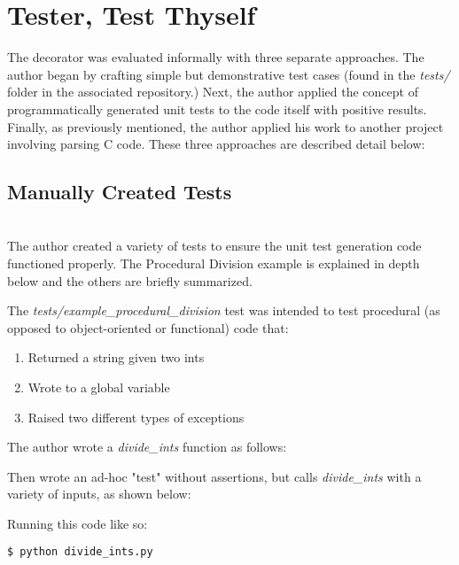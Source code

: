 \section{Tester, Test Thyself}\label{sec:evaluation}

The decorator was evaluated informally with three separate approaches.
The author began by crafting simple but demonstrative test cases 
(found in the \textit{tests/} folder in the associated repository.) Next,
the author applied the concept of programmatically generated unit tests
to the code itself with positive results.  Finally, as previously mentioned, 
the author applied his work to another project involving parsing C code. 
These three approaches are described detail below:

\subsection{Manually Created Tests}\label{sec:eval-1}
\hfill\\
The author created a variety of tests to ensure the unit test generation 
code functioned properly. The Procedural Division example is explained in depth
below and the others are briefly summarized.

The \textit{tests/example\_procedural\_division} test was intended 
to test procedural (as opposed to object-oriented or functional) code that:  

\begin{enumerate}
    \item Returned a string given two ints
    \item Wrote to a global variable
    \item Raised two different types of exceptions
\end{enumerate}

The author wrote a \textit{divide\_ints} function as follows:



Then wrote an ad-hoc "test" without assertions, but calls 
\textit{divide\_ints} with a variety of inputs, as shown below:



Running this code like so:

\begin{lstlisting}[language=bash]
    $ python divide_ints.py
\end{lstlisting}
    
